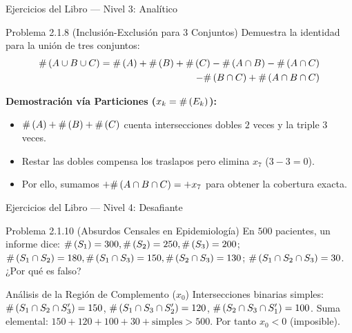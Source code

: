 \begin{frame}{Ejercicios del Libro — Nivel 3: Analítico}
  \small
  \begin{block}{Problema 2.1.8 (Inclusión-Exclusión para 3 Conjuntos)}
    Demuestra la identidad para la unión de tres conjuntos:
    \begin{align*}
      \#\left( A \cup B \cup C \right) = \#\left( A \right) + \#\left( B \right) + \#\left( C \right) - \#\left( A \cap B \right) - \#\left( A \cap C \right) \\
      - \#\left( B \cap C \right) + \#\left( A \cap B \cap C \right)
    \end{align*}
  \end{block}
  
  \pause
  \textbf{Demostración vía Particiones ($x_k = \#\left( E_k \right)$):}
  \begin{itemize}
    \item $\#\left( A \right) + \#\left( B \right) + \#\left( C \right)$ cuenta intersecciones dobles $2$ veces y la triple $3$ veces. \pause
    \item Restar las dobles compensa los traslapos pero elimina $x_7$ ($3 - 3 = 0$). \pause
    \item Por ello, sumamos $+ \#\left( A \cap B \cap C \right) = +x_7$ para obtener la cobertura exacta.
  \end{itemize}
\end{frame}

\begin{frame}{Ejercicios del Libro — Nivel 4: Desafiante}
  \small
  \begin{block}{Problema 2.1.10 (Absurdos Censales en Epidemiología)}
    En $500$ pacientes, un informe dice: $\#\left( S_1 \right)=300, \#\left( S_2 \right)=250, \#\left( S_3 \right)=200$; $\#\left( S_1 \cap S_2 \right)=180, \#\left( S_1 \cap S_3 \right)=150, \#\left( S_2 \cap S_3 \right)=130$; $\#\left( S_1 \cap S_2 \cap S_3 \right)=30$. ¿Por qué es falso?
  \end{block}
  
  \pause
  \begin{alertblock}{Análisis de la Región de Complemento ($x_0$)}
    Intersecciones binarias simples: $\#\left( S_1 \cap S_2 \cap S_3' \right) = 150$, $\#\left( S_1 \cap S_3 \cap S_2' \right) = 120$, $\#\left( S_2 \cap S_3 \cap S_1' \right) = 100$.
    \pause
    Suma elemental: $150+120+100+30 + \text{simples} > 500$. Por tanto $x_0 < 0$ (imposible).
  \end{alertblock}
\end{frame}

